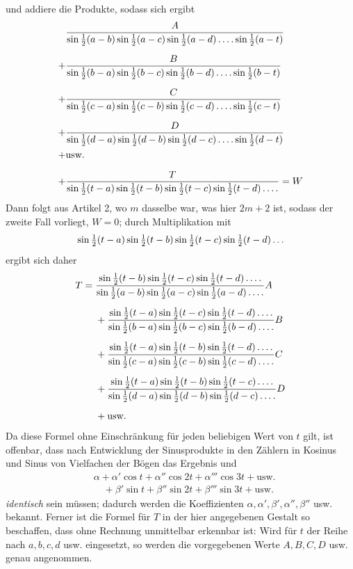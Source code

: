 und addiere die Produkte, sodass sich ergibt
\[
\begin{aligned}
&\frac{A}{\sin\tfrac12(a-b)\sin\tfrac12(a-c)\sin\tfrac12(a-d)\mathinner{.\,.\,.\,.}\sin\tfrac12(a-t)}\\[6pt]
+{}&\frac{B}{\sin\tfrac12(b-a)\sin\tfrac12(b-c)\sin\tfrac12(b-d)\mathinner{.\,.\,.\,.}\sin\tfrac12(b-t)}\\[6pt]
+{}&\frac{C}{\sin\tfrac12(c-a)\sin\tfrac12(c-b)\sin\tfrac12(c-d)\mathinner{.\,.\,.\,.}\sin\tfrac12(c-t)}\\[6pt]
+{}&\frac{D}{\sin\tfrac12(d-a)\sin\tfrac12(d-b)\sin\tfrac12(d-c)\mathinner{.\,.\,.\,.}\sin\tfrac12(d-t)}\\
+{}&\text{usw.}\\[6pt]
+{}&\frac{T}{\sin\tfrac12(t-a)\sin\tfrac12(t-b)\sin\tfrac12(t-c)\sin\tfrac12(t-d)\mathinner{.\,.\,.\,.}}=W
\end{aligned}
\]
Dann folgt aus Artikel 2, wo $m$ dasselbe war, was hier $2m+2$ ist, sodass der zweite Fall vorliegt, $W=0$; durch Multiplikation mit
\[
\sin\tfrac12(t-a)\sin\tfrac12(t-b)\sin\tfrac12(t-c)\sin\tfrac12(t-d)\mathinner{.\,.\,.}
\]
ergibt sich daher
\[
\begin{aligned}
T={}&\frac{\sin\tfrac12(t-b)\sin\tfrac12(t-c)\sin\tfrac12(t-d)\mathinner{.\,.\,.\,.}}
{\sin\tfrac12(a-b)\sin\tfrac12(a-c)\sin\tfrac12(a-d)\mathinner{.\,.\,.\,.}}A\\[5pt]
&+\frac{\sin\tfrac12(t-a)\sin\tfrac12(t-c)\sin\tfrac12(t-d)\mathinner{.\,.\,.\,.}}
{\sin\tfrac12(b-a)\sin\tfrac12(b-c)\sin\tfrac12(b-d)\mathinner{.\,.\,.\,.}}B\\[5pt]
&+\frac{\sin\tfrac12(t-a)\sin\tfrac12(t-b)\sin\tfrac12(t-d)\mathinner{.\,.\,.\,.}}
{\sin\tfrac12(c-a)\sin\tfrac12(c-b)\sin\tfrac12(c-d)\mathinner{.\,.\,.\,.}}C\\[5pt]
&+\frac{\sin\tfrac12(t-a)\sin\tfrac12(t-b)\sin\tfrac12(t-c)\mathinner{.\,.\,.\,.}}
{\sin\tfrac12(d-a)\sin\tfrac12(d-b)\sin\tfrac12(d-c)\mathinner{.\,.\,.\,.}}D\\[5pt]
&+\text{usw.}
\end{aligned}
\]
Da diese Formel ohne Einschränkung für jeden beliebigen Wert von $t$ gilt, ist offenbar, dass nach Entwicklung der Sinusprodukte in den Zählern in Kosinus und Sinus von Vielfachen
der Bögen das Ergebnis und
\[
\begin{aligned}
&\alpha+\alpha'\cos t+\alpha''\cos2t+\alpha'''\cos3t+\text{usw.}\\
&\quad+\beta'\sin t+\beta''\sin2t+\beta'''\sin3t+\text{usw.}
\end{aligned}
\]
\emph{identisch} sein müssen; dadurch werden die Koeffizienten $\alpha,\alpha',\beta',\alpha'',\beta''$ usw. bekannt. Ferner ist die Formel für $T$ in der hier angegebenen Gestalt so beschaffen, dass ohne Rechnung unmittelbar erkennbar ist: Wird für $t$ der Reihe nach $a,b,c,d$ usw. eingesetzt, so werden die vorgegebenen Werte $A,B,C,D$
usw. genau angenommen.


